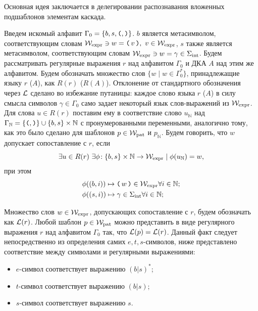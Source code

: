Основная идея заключается в делегировании распознавания вложенных подшаблонов элементам каскада.

Введем искомый алфавит $\Gamma_0 = \{b, s, \textnormal{\texttt{(}}, \textnormal{\texttt{)}}\}$. $b$ является метасимволом, 
соответствующим словам $\mathcal{W}_{\text{expr}} \ni w = \textnormal{\texttt{(}}\, v \,\textnormal{\texttt{)}},\ v \in \mathcal{W}_{\text{expr}}$, $s$ также является метасимволом, 
соответствующим словам $\mathcal{W}_{\text{expr}} \ni w = \gamma \in \Sigma_{\text{int}}$.
Будем рассматривать регулярные выражения $r$ над алфавитом $\Gamma_0$ и ДКА $A$ над этим же алфавитом. 
Будем обозначать множество слов $\{w \mid w \in \Gamma_0^*\}$, принадлежащие языку $r$ ($A$), как $R(r)$ ($R(A)$).
Отклонение от стандартного обозначения через $\mathcal{L}$ сделано во избежание путаницы: каждое слово языка $r$ ($A$) 
в силу смысла символов $\gamma \in \Gamma_0$ само задает некоторый язык слов-выражений из $\mathcal{W}_{\text{expr}}$.
Для слова $u \in R(r)$ поставим ему в соответствие слово $u_\mathbb{N}$ над 
$\Gamma_\mathbb{N} = \{\textnormal{\texttt{(}}, \textnormal{\texttt{)}}\} \cup \{b, s\} \times \mathbb{N}$ с пронумерованными переменными, 
аналогично тому, как это было сделано для шаблонов $p \in \mathcal{W}_{\text{pat}}$ и $p_\mathbb{N}$.
Будем говорить, что $w$ допускает сопоставление с $r$, если
$$
\exists u \in R(r)\ \exists \phi\!: \{b, s\} \times \mathbb{N} \to \mathcal{W}_{\text{expr}} \mid \phi(u_\mathbb{N}) = w,
$$
при этом
\begin{align*}
& \phi((b, i)) \mapsto \textnormal{\texttt{(}}\, w \,\textnormal{\texttt{)}} \in \mathcal{W}_{\text{expr}} \forall i \in \mathbb{N}; \\
& \phi((s, i)) \mapsto \gamma \in \Sigma_{\text{int}} \forall i \in \mathbb{N};
\end{align*}

Множество слов $w \in \mathcal{W}_{\text{expr}}$, допускающих сопоставление с $r$, будем обозначать как $\mathcal{L}(r)$.
Любой шаблон $p \in \mathcal{W}_{\text{pat}}$ можно представить в виде регулярного выражения $r$ 
над алфавитом $\Gamma_0$ так, что $\mathcal{L}(p) = \mathcal{L}(r)$.
Данный факт следует непосредственно из определения самих $e, t, s$-символов, 
ниже представлено соответствие между символами и регулярными выражениями:
\begin{itemize}
\item $e$-символ соответствует выражению $(b|s)^*$;
\item $t$-символ соответствует выражению $(b|s)$;
\item $s$-символ соответствует выражению $s$.
\end{itemize}

